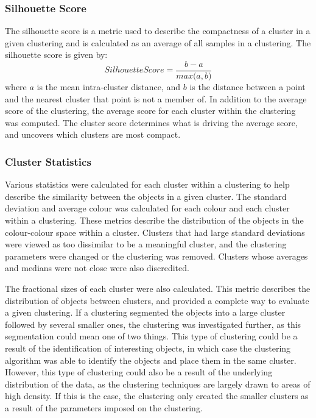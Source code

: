 \subsubsection{Silhouette Score}
The silhouette score is a metric used to describe the compactness of a cluster in a given clustering and is calculated as an average of all samples in a clustering.  
The silhouette score is given by:
\begin{equation}
\label{eq:ss}
Silhouette Score = \frac{b - a}{\textit{max}\big(a, b\big)}
\end{equation}
where $a$ is the mean intra-cluster distance, and $b$ is the distance between a point and the nearest cluster that point is not a member of.
In addition to the average score of the clustering, the average score for each cluster within the clustering was computed.
The cluster score determines what is driving the average score, and uncovers which clusters are most compact.

\subsubsection{Cluster Statistics}
Various statistics were calculated for each cluster within a clustering to help describe the similarity between the objects in a given cluster.
The standard deviation and average colour was calculated for each colour and each cluster within a clustering. 
These metrics describe the distribution of the objects in the colour-colour space within a cluster. 
Clusters that had large standard deviations were viewed as too dissimilar to be a meaningful cluster, and the clustering parameters were changed or the clustering was removed. 
Clusters whose averages and medians were not close were also discredited. 

The fractional sizes of each cluster were also calculated.
This metric describes the distribution of objects between clusters, and provided a complete way to evaluate a given clustering. 
If a clustering segmented the objects into a large cluster followed by several smaller ones, the clustering was investigated further, as this segmentation could mean one of two things. 
This type of clustering could be a result of the identification of interesting objects, in which case the clustering algorithm was able to identify the objects and place them in the same cluster.
However, this type of clustering could also be a result of the underlying distribution of the data, as the clustering techniques are largely drawn to areas of high density.
If this is the case, the clustering only created the smaller clusters as a result of the parameters imposed on the clustering.

